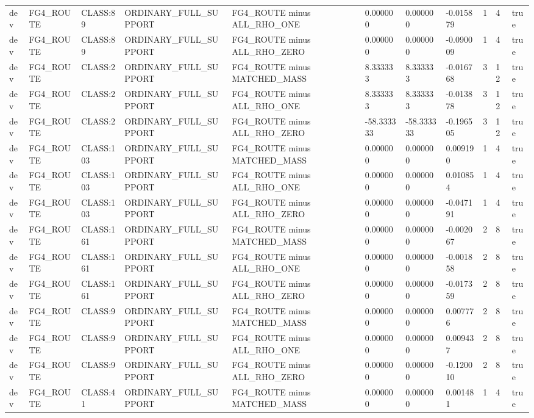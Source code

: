 \begin{tabular}{lllllllllll}
dev & FG4\_ROUTE & CLASS:89 & ORDINARY\_FULL\_SUPPORT & FG4\_ROUTE minus ALL\_RHO\_ONE & 0.000000 & 0.000000 & -0.015879 & 1 & 4 & true \\
dev & FG4\_ROUTE & CLASS:89 & ORDINARY\_FULL\_SUPPORT & FG4\_ROUTE minus ALL\_RHO\_ZERO & 0.000000 & 0.000000 & -0.090009 & 1 & 4 & true \\
dev & FG4\_ROUTE & CLASS:2 & ORDINARY\_FULL\_SUPPORT & FG4\_ROUTE minus MATCHED\_MASS & 8.333333 & 8.333333 & -0.016768 & 3 & 12 & true \\
dev & FG4\_ROUTE & CLASS:2 & ORDINARY\_FULL\_SUPPORT & FG4\_ROUTE minus ALL\_RHO\_ONE & 8.333333 & 8.333333 & -0.013878 & 3 & 12 & true \\
dev & FG4\_ROUTE & CLASS:2 & ORDINARY\_FULL\_SUPPORT & FG4\_ROUTE minus ALL\_RHO\_ZERO & -58.333333 & -58.333333 & -0.196505 & 3 & 12 & true \\
dev & FG4\_ROUTE & CLASS:103 & ORDINARY\_FULL\_SUPPORT & FG4\_ROUTE minus MATCHED\_MASS & 0.000000 & 0.000000 & 0.009190 & 1 & 4 & true \\
dev & FG4\_ROUTE & CLASS:103 & ORDINARY\_FULL\_SUPPORT & FG4\_ROUTE minus ALL\_RHO\_ONE & 0.000000 & 0.000000 & 0.010854 & 1 & 4 & true \\
dev & FG4\_ROUTE & CLASS:103 & ORDINARY\_FULL\_SUPPORT & FG4\_ROUTE minus ALL\_RHO\_ZERO & 0.000000 & 0.000000 & -0.047191 & 1 & 4 & true \\
dev & FG4\_ROUTE & CLASS:161 & ORDINARY\_FULL\_SUPPORT & FG4\_ROUTE minus MATCHED\_MASS & 0.000000 & 0.000000 & -0.002067 & 2 & 8 & true \\
dev & FG4\_ROUTE & CLASS:161 & ORDINARY\_FULL\_SUPPORT & FG4\_ROUTE minus ALL\_RHO\_ONE & 0.000000 & 0.000000 & -0.001858 & 2 & 8 & true \\
dev & FG4\_ROUTE & CLASS:161 & ORDINARY\_FULL\_SUPPORT & FG4\_ROUTE minus ALL\_RHO\_ZERO & 0.000000 & 0.000000 & -0.017359 & 2 & 8 & true \\
dev & FG4\_ROUTE & CLASS:9 & ORDINARY\_FULL\_SUPPORT & FG4\_ROUTE minus MATCHED\_MASS & 0.000000 & 0.000000 & 0.007776 & 2 & 8 & true \\
dev & FG4\_ROUTE & CLASS:9 & ORDINARY\_FULL\_SUPPORT & FG4\_ROUTE minus ALL\_RHO\_ONE & 0.000000 & 0.000000 & 0.009437 & 2 & 8 & true \\
dev & FG4\_ROUTE & CLASS:9 & ORDINARY\_FULL\_SUPPORT & FG4\_ROUTE minus ALL\_RHO\_ZERO & 0.000000 & 0.000000 & -0.120010 & 2 & 8 & true \\
dev & FG4\_ROUTE & CLASS:41 & ORDINARY\_FULL\_SUPPORT & FG4\_ROUTE minus MATCHED\_MASS & 0.000000 & 0.000000 & 0.001481 & 1 & 4 & true \\

\end{tabular}
